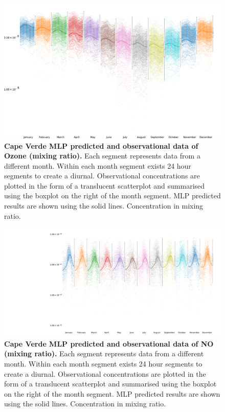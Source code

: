 \begin{figure}[H]
     \centering
         \includegraphics[width=.90\textheight,angle =90,trim={0 0 0 0}]{figures_c3/mlpregressor/CVNOX_CapeVerde/O3.png}
        \caption{\textbf{Cape Verde MLP predicted and observational data of Ozone (mixing ratio).} Each segment represents data from a different month. Within each month segment exists 24 hour segments to create a diurnal. Observational concentrations are plotted in the form of a translucent scatterplot and summarised using the boxplot on the right of the month segment. MLP predicted results are shown using the solid lines. Concentration in mixing ratio.}
        \label{fig:mlpo3}
\end{figure}

\begin{figure}[H]
     \centering
         \includegraphics[width=.90\textheight,angle =90,trim={8cm 0 0 0}]{figures_c3/mlpregressor/CVNOX_CapeVerde/NO.pdf}
        \caption{\textbf{Cape Verde MLP predicted and observational data of NO (mixing ratio).} Each segment represents data from a different month. Within each month segment exists 24 hour segments to create a diurnal. Observational concentrations are plotted in the form of a translucent scatterplot and summarised using the boxplot on the right of the month segment. MLP predicted results are shown using the solid lines. Concentration in mixing ratio.}
        \label{fig:mlpno}
\end{figure}

